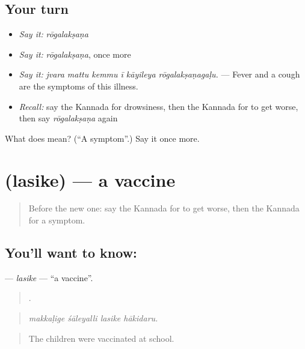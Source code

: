 \subsection*{Your turn}
\begin{itemize}
\raggedright
  \item \emph{Say it:} \emph{rōgalakṣaṇa}
  \item \emph{Say it:} \emph{rōgalakṣaṇa}, once more
  \item \emph{Say it:} \emph{jvara mattu kemmu ī kāyileya rōgalakṣaṇagaḷu.} — Fever and a cough are the symptoms of this illness.
  \item \emph{Recall:} say the Kannada for drowsiness, then the Kannada for to get worse, then say \emph{rōgalakṣaṇa} again
\end{itemize}

\begin{tcolorbox}[breakable,colback=teal!4,colframe=teal!35!black,title={Before you move on}]
What does  mean? (\textquotedblleft{}A symptom\textquotedblright{}.) Say it once more.
\end{tcolorbox}
\section[\texorpdfstring{\kn{ಲಸಿಕೆ} (lasike)}{ಲಸಿಕೆ (lasike)}]{ (lasike) — a vaccine}

\label{lesson:KA-C511-lasike}



\begin{quote}
Before the new one: say the Kannada for to get worse, then the Kannada for a symptom.
\end{quote}

\subsection*{You'll want to know: }
\textbf{} — \emph{lasike} — \textquotedblleft{}a vaccine\textquotedblright{}.

\begin{quote}
   .
\end{quote}

\begin{quote}
\emph{makkaḷige śāleyalli lasike hākidaru.}
\end{quote}

\begin{quote}
The children were vaccinated at school.
\end{quote}

